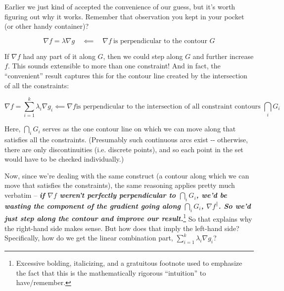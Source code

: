 \documentclass[letterpaper,12pt]{report}
\begin{document}
Earlier we just kind of accepted the convenience of our guess, but it's
worth figuring out why it works. Remember that observation you kept in
your pocket (or other handy container)?

\[\nabla f = \lambda \nabla g \quad \impliedby \quad \nabla f \ \text{is perpendicular to the contour } G \]

If \(\nabla f\) had any part of it along \(G\), then we could step along
\(G\) and further increase \(f\). This sounds extensible to more than
one constraint! And in fact, the ``convenient'' result captures this for
the contour line created by the intersection of all the constraints:

\[
  \nabla f = \sum_{i=1}^k \lambda _i \nabla g_i  \impliedby
  \nabla f \text{is perpendicular to the intersection
  of all constraint contours } \bigcap _i G_i 
\]

Here, \(\bigcap _i G_i\) serves as the one contour line on which we can
move along that satisfies all the constraints. (Presumably such
continuous arcs exist -\/- otherwise, there are only discontinuities
(i.e. discrete points), and so each point in the set would have to be
checked individually.)

Now, since we're dealing with the same construct (a contour along which
we can move that satisfies the constraints), the same reasoning applies
pretty much verbatim -- \emph{\textbf{if \(\nabla f\) weren't perfectly
perpendicular to \(\bigcap _i G_i\), we'd be wasting the component of
the gradient going along \(\bigcap _i G_i\), \(\nabla f ^{\parallel}\).
So we'd just step along the contour and improve our result.}}\footnote{
  Excessive bolding, italicizing, and a gratuitous footnote 
  used to emphasize the fact that this is the
  mathematically rigorous ``intuition'' to have/remember.
}
So that explains why the right-hand side makes sense. But how does that
imply the left-hand side? Specifically, how do we get the linear
combination part, \( \sum_{i=1}^k \lambda _i \nabla g_i \)?
\end{document}
